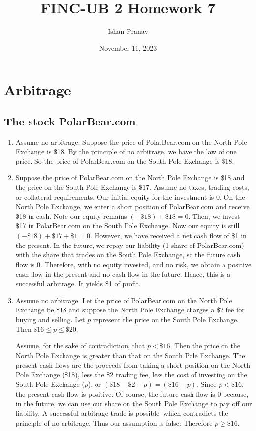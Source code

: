 \documentclass[12pt]{article}
\title{FINC-UB 2 Homework 7}
\author{Ishan Pranav}
\date{November 11, 2023}
\begin{document}
\maketitle
\section{Arbitrage}
\subsection{The stock PolarBear.com}
\begin{enumerate}
\item Assume no arbitrage. Suppose the price of PolarBear.com on the North Pole Exchange is \$18. By the principle of no arbitrage, we have the law of one price. So the price of PolarBear.com on the South Pole Exchange is \$18.
\item Suppose the price of PolarBear.com on the North Pole Exchange is \$18 and the price on the South Pole Exchange is \$17. Assume no taxes, trading costs, or collateral requirements. Our initial equity for the investment is 0. On the North Pole Exchange, we enter a short position of PolarBear.com and receive \$18 in cash. Note our equity remains $(-\$18)+\$18=0$. Then, we invest \$17 in PolarBear.com on the South Pole Exchange. Now our equity is still $(-\$18)+\$17+\$1=0$. However, we have received a net cash flow of \$1 in the present. In the future, we repay our liability (1 share of PolarBear.com) with the share that trades on the South Pole Exchange, so the future cash flow is 0. Therefore, with no equity invested, and no risk, we obtain a positive cash flow in the present and no cash flow in the future. Hence, this is a successful arbitrage. It yields \$1 of profit.
\item Assume no arbitrage. Let the price of PolarBear.com on the North Pole Exchange be \$18 and suppose the North Pole Exchange charges a \$2 fee for buying and selling. Let $p$ represent the price on the South Pole Exchange. Then $\$16\leq p\leq\$20$. 

Assume, for the sake of contradiction, that $p<\$16$. Then the price on the North Pole Exchange is greater than that on the South Pole Exchange. The present cash flows are the proceeds from taking a short position on the North Pole Exchange (\$18), less the \$2 trading fee, less the cost of investing on the South Pole Exchange ($p$), or $(\$18-\$2-p)=(\$16-p)$. Since $p<\$16$, the present cash flow is positive. Of course, the future cash flow is 0 because, in the future, we can use our share on the South Pole Exchange to pay off our liability. A successful arbitrage trade is possible, which contradicts the principle of no arbitrage. Thus our assumption is false: Therefore $p\geq\$16$.


\end{enumerate}
\end{document}
